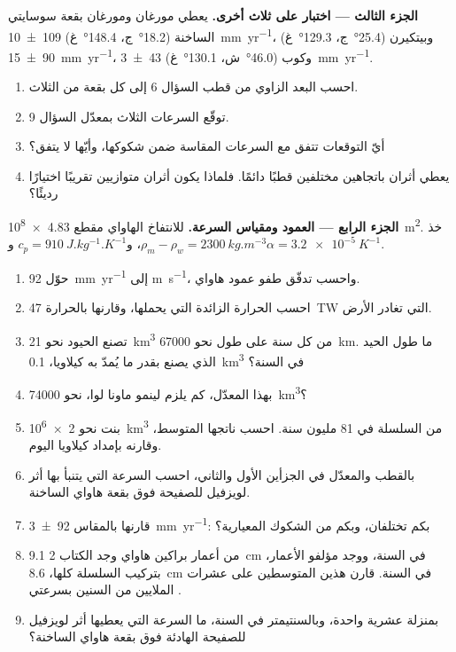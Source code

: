 \begin{problem}
\medskip
\noindent\textbf{الجزء الثالث --- اختبار على ثلاث  أخرى.} يعطي مورغان ومورغان بقعة سوسايتي الساخنة (\ang{18.2}~ج، \ang{148.4}~غ) \qty[uncertainty-mode=separate]{109 \pm 10}{mm.yr^{-1}}، وبيتكيرن (\ang{25.4}~ج، \ang{129.3}~غ) \qty[uncertainty-mode=separate]{90 \pm 15}{mm.yr^{-1}}، وكوب (\ang{46.0}~ش، \ang{130.1}~غ) \qty[uncertainty-mode=separate]{43 \pm 3}{mm.yr^{-1}}.
\begin{enumerate}[resume]
  \item احسب البعد الزاوي من قطب السؤال 6 إلى كل بقعة من  الثلاث.
  \item توقّع السرعات الثلاث بمعدّل السؤال 9.
  \item أيّ التوقعات تتفق مع السرعات المقاسة ضمن شكوكها، وأيّها لا يتفق؟
  \item يعطي أثران باتجاهين مختلفين قطبًا دائمًا. فلماذا يكون أثران متوازيين تقريبًا اختيارًا رديئًا؟
\end{enumerate}

\medskip
\noindent\textbf{الجزء الرابع --- العمود ومقياس السرعة.} للانتفاخ الهاواي مقطع \qty{4.83e8}{m^2}. خذ $\rho_m - \rho_w = \qty{2300}{kg.m^{-3}}$، و$c_p = \qty{910}{J.kg^{-1}.K^{-1}}$ و$\alpha = \qty{3.2e-5}{K^{-1}}$.
\begin{enumerate}[resume]
  \item حوّل \qty{92}{mm.yr^{-1}} إلى \unit{m.s^{-1}}، واحسب تدفّق طفو عمود هاواي.
  \item احسب الحرارة الزائدة التي يحملها، وقارنها بالحرارة \qty{47}{TW} التي تغادر الأرض.
  \item تصنع الحيود نحو \qty{21}{km^3} من  كل سنة على طول نحو \qty{67000}{km}. ما طول الحيد الذي يصنع  بقدر ما يُمدّ به كيلاويا، \qty{0.1}{km^3} في السنة؟
  \item بهذا المعدّل، كم يلزم لينمو ماونا لوا، نحو \qty{74000}{km^3}؟
  \item بنت  نحو \qty{2e6}{km^3} من السلسلة في 81 مليون سنة. احسب ناتجها المتوسط، وقارنه بإمداد كيلاويا اليوم.
  \item بالقطب والمعدّل في الجزأين الأول والثاني، احسب السرعة التي يتنبأ بها أثر لويزفيل للصفيحة فوق بقعة هاواي الساخنة.
  \item قارنها بالمقاس \qty[uncertainty-mode=separate]{92 \pm 3}{mm.yr^{-1}}: بكم تختلفان، وبكم من الشكوك المعيارية؟
  \item من أعمار براكين هاواي وجد الكتاب 2 \qty{9.1}{cm} في السنة، ووجد مؤلفو الأعمار، بتركيب السلسلة كلها، \qty{8.6}{cm} في السنة. قارن هذين المتوسطين على عشرات الملايين من السنين بسرعتي .
  \item بمنزلة عشرية واحدة، وبالسنتيمتر في السنة، ما السرعة التي يعطيها أثر لويزفيل للصفيحة الهادئة فوق بقعة هاواي الساخنة؟
\end{enumerate}
\end{problem}
